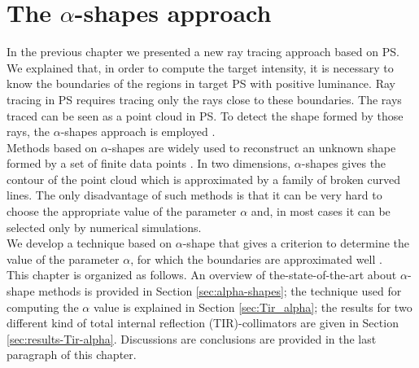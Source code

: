 \chapter{The $\alpha$-shapes approach}\label{chap:boundaries_alpha}
In the previous chapter we presented a new ray tracing approach based on PS. We explained that, in order to compute the target intensity, it is necessary to know the boundaries of the regions in target PS with positive luminance. Ray tracing in PS requires tracing only the rays close to these boundaries. The rays traced can be seen as a point cloud in PS. To detect the shape formed by those rays, the $\alpha$-shapes approach is employed \cite{portegies2013fast}.\\ \indent
Methods based on $\alpha$-shapes are widely used to reconstruct an unknown shape formed by a set of finite data points \cite{guo1997surface}. In two dimensions, $\alpha$-shapes gives the contour of the point cloud which is approximated by a family of broken curved lines. 
The only disadvantage of such methods is that it can be very hard to choose the appropriate value of the parameter $\alpha$ and, in most cases it can be selected only by numerical simulations.\\ \indent
We develop a technique based on $\alpha$-shape that gives a criterion to determine the value of the parameter $\alpha$, for which the boundaries are approximated well \cite{filosa2015new}.\\ \indent This chapter is organized as follows. An overview of the-state-of-the-art about $\alpha$-shape methods is provided in Section \ref{sec:alpha-shapes}; the technique used for computing the $\alpha$ value is explained in Section \ref{sec:Tir_alpha}; the results for two different kind of total internal reflection (TIR)-collimators are given in Section \ref{sec:results-Tir-alpha}. Discussions are conclusions are provided in the last paragraph of this chapter.
